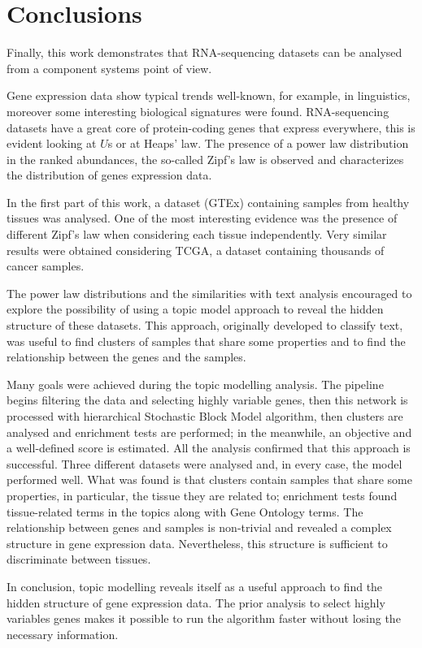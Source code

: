 \chapter{Conclusions}\label{ch:conclusions}
Finally, this work demonstrates that RNA-sequencing datasets can be analysed from a component systems point of view.

Gene expression data show typical trends well-known, for example, in linguistics, moreover some interesting biological signatures were found. RNA-sequencing datasets have a great core of protein-coding genes that express everywhere, this is evident looking at $U$s or at Heaps' law. The presence of a power law distribution in the ranked abundances, the so-called Zipf's law is observed and characterizes the distribution of genes expression data.

In the first part of this work, a dataset (GTEx) containing samples from healthy tissues was analysed. One of the most interesting evidence was the presence of different Zipf's law when considering each tissue independently. Very similar results were obtained considering TCGA, a dataset containing thousands of cancer samples.

The power law distributions and the similarities with text analysis encouraged to explore the possibility of using a topic model approach to reveal the hidden structure of these datasets. This approach, originally developed to classify text, was useful to find clusters of samples that share some properties and to find the relationship between the genes and the samples.

Many goals were achieved during the topic modelling analysis. The pipeline begins filtering the data and selecting highly variable genes, then this network is processed with hierarchical Stochastic Block Model algorithm, then clusters are analysed and enrichment tests are performed; in the meanwhile, an objective and a well-defined score is estimated. All the analysis confirmed that this approach is successful. Three different datasets were analysed and, in every case, the model performed well. What was found is that clusters contain samples that share some properties, in particular, the tissue they are related to; enrichment tests found tissue-related terms in the topics along with Gene Ontology terms. The relationship between genes and samples is non-trivial and revealed a complex structure in gene expression data. Nevertheless, this structure is sufficient to discriminate between tissues.

In conclusion, topic modelling reveals itself as a useful approach to find the hidden structure of gene expression data. The prior analysis to select highly variables genes makes it possible to run the algorithm faster without losing the necessary information.


